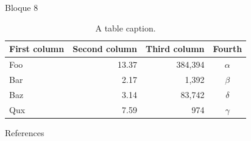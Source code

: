 \documentclass[final]{beamer}
\newlength{\sepwidth}
\newlength{\colwidth}
\newcommand{\separatorcolumn}{\begin{column}{\sepwidth}\end{column}}
\begin{document}
\begin{frame}[t]
\begin{columns}[t]
\begin{column}{\colwidth}
\begin{block}{Bloque 8}
    \begin{table}
      \centering
      \begin{tabular}{l r r c}
        \toprule
        \textbf{First column} & \textbf{Second column} & \textbf{Third column} & \textbf{Fourth} \\
        \midrule
        Foo & 13.37 & 384,394 & $\alpha$ \\
        Bar & 2.17 & 1,392 & $\beta$ \\
        Baz & 3.14 & 83,742 & $\delta$ \\
        Qux & 7.59 & 974 & $\gamma$ \\
        \bottomrule
      \end{tabular}
      \caption{A table caption.}
    \end{table}

  \end{block}
  \begin{block}{References}

    \nocite{*}
    \footnotesize{}

  \end{block}

\end{column}

\separatorcolumn
\end{columns}
\end{frame}
\end{document}
